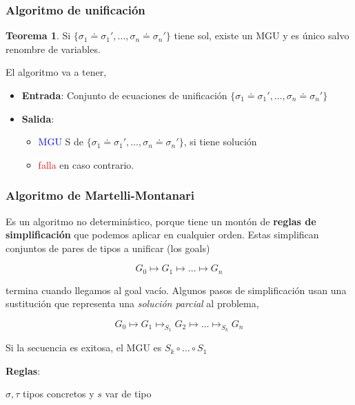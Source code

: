 \documentclass{report}
\theoremstyle{definition} %
\newtheorem{theorem}{Teorema}[chapter]
\newcommand{\changed}[1]{\textcolor{Red}{#1}}
\newcommand{\select}[1]{\textcolor{Blue}{#1}}
\newcommand{\comp}[2]{#1 \circ #2}
\newcommand{\unify}[2]{#1 \doteq #2}
\newcommand{\unifySetD}{\{
    \unify{\sigma_1}{\sigma_1'},
    \dots,
    \unify{\sigma_n}{\sigma_n'} 
\}}
\newcommand{\simpSust}[1]{\mapsto_{#1}}
\newcommand{\simp}{\mapsto}
\begin{document}
\subsubsection{Algoritmo de unificación}

\begin{theorem}
    Si $\unifySetD$ tiene sol, existe un MGU y es único salvo renombre de variables.
\end{theorem}
 
El algoritmo va a tener,

\begin{itemize}
    \item \textbf{Entrada}: Conjunto de ecuaciones de unificación $\unifySetD$
    \item \textbf{Salida}:
    \begin{itemize}
        \item \select{MGU} S de $\unifySetD$, si tiene solución
        \item \changed{falla} en caso contrario.
    \end{itemize}
\end{itemize}

\subsubsection{Algoritmo de Martelli-Montanari}

Es un algoritmo no determinístico, porque tiene un montón de \textbf{reglas de
simplificación} que podemos aplicar en cualquier orden. Estas simplifican
conjuntos de pares de tipos a unificar (los goals)

\[G_0 \simp G_1 \simp \dots \simp G_n \]

termina cuando llegamos al goal vacío. Algunos pasos de simplificación usan una
sustitución que representa una \textit{solución parcial} al problema,

\[
    G_0 \simp G_1
    \simpSust{S_1} G_2
    \simp \dots
    \simpSust{S_k} G_n
\]

Si la secuencia es exitosa, el MGU es $\comp{S_k}{\comp{\dots}{S_1}}$

\textbf{Reglas}:

$\sigma, \tau$ tipos concretos y $s$ var de tipo
\end{document}
